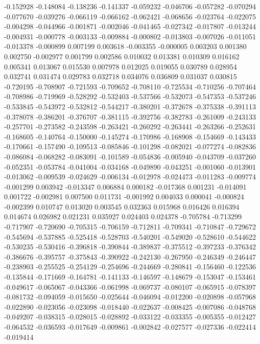 -0.152928
-0.148084
-0.138236
-0.141337
-0.059232
-0.046706
-0.057282
-0.070294
-0.077670
-0.039276
-0.066119
-0.066162
-0.062421
-0.068656
-0.023764
-0.022075
-0.004298
-0.044966
-0.001871
-0.002046
-0.041465
-0.027342
-0.017807
-0.013244
-0.004931
-0.000778
-0.003133
-0.009884
-0.000802
-0.013803
-0.007026
-0.011051
-0.013378
-0.000899
0.007199
0.003618
-0.003355
-0.000005
0.003203
0.001380
0.002750
-0.002977
0.001799
0.002586
0.010032
0.013381
0.010309
0.016162
0.005341
0.013067
0.015530
0.007978
0.012025
0.019055
0.030789
0.028954
0.032741
0.031474
0.029783
0.032718
0.034076
0.036809
0.031037
0.030815
-0.720195
-0.708907
-0.721593
-0.709652
-0.708110
-0.725534
-0.710256
-0.707464
-0.708986
-0.719969
-0.528292
-0.532403
-0.537566
-0.532073
-0.547353
-0.537246
-0.533845
-0.543972
-0.532812
-0.544217
-0.380201
-0.372678
-0.375338
-0.391113
-0.378078
-0.386201
-0.376707
-0.381115
-0.392756
-0.382783
-0.261009
-0.243133
-0.257701
-0.273582
-0.243598
-0.263421
-0.260292
-0.263441
-0.263266
-0.252631
-0.168605
-0.140764
-0.150000
-0.145274
-0.170986
-0.168908
-0.154669
-0.143433
-0.170661
-0.157490
-0.109513
-0.085846
-0.101298
-0.082021
-0.077274
-0.082836
-0.086084
-0.068282
-0.083091
-0.101589
-0.054836
-0.005940
-0.043709
-0.037260
-0.052351
-0.053784
-0.041004
-0.034168
-0.049890
-0.043251
-0.001060
-0.013901
-0.013062
-0.009539
-0.024629
-0.006134
-0.012978
-0.024473
-0.011283
-0.009774
-0.001299
0.003942
-0.013347
0.006884
0.000182
-0.017368
0.001231
-0.014091
0.001722
-0.002981
0.007500
0.011731
-0.001992
0.004033
0.000041
-0.000824
-0.002399
0.010747
0.013020
0.003545
0.032363
0.015968
0.016426
0.016394
0.014674
0.026982
0.021231
0.035927
0.024403
0.024378
-0.705784
-0.713299
-0.717907
-0.720690
-0.705315
-0.706159
-0.712811
-0.709341
-0.710847
-0.729672
-0.545694
-0.537885
-0.525418
-0.528703
-0.540201
-0.549020
-0.528610
-0.544622
-0.530235
-0.530416
-0.396818
-0.390844
-0.389837
-0.375512
-0.397233
-0.376342
-0.386676
-0.395757
-0.375843
-0.390922
-0.242130
-0.267950
-0.246349
-0.246447
-0.238903
-0.255525
-0.254129
-0.254696
-0.244669
-0.280841
-0.156460
-0.122536
-0.135844
-0.171669
-0.164781
-0.141133
-0.146597
-0.148679
-0.153047
-0.153461
-0.049617
-0.065067
-0.043366
-0.061998
-0.069737
-0.080107
-0.065915
-0.078397
-0.081732
-0.094059
-0.015650
-0.025644
-0.046094
-0.012200
-0.020898
-0.057968
-0.022890
-0.023056
-0.023098
-0.018440
-0.022637
-0.008425
-0.007086
-0.048768
-0.049207
-0.038315
-0.028015
-0.028892
-0.033122
-0.033355
-0.005355
-0.012427
-0.064532
-0.036593
-0.017649
-0.009861
-0.002842
-0.027577
-0.027336
-0.022414
-0.019414
